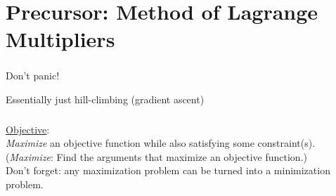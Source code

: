\section{Precursor: Method of Lagrange Multipliers}


\begin{frame}\frametitle{\secname} 
    \begin{center}
    \slidesonly{\huge}
	Don't panic!
    \end{center}
    \begin{center}
        Essentially just hill-climbing (gradient ascent)
    \end{center}
\end{frame}

\begin{frame}\frametitle{\secname}

\underline{Objective}: \\
\textit{Maximize} an objective function while also satisfying some constraint(s).\\
{
\small(\textit{Maximize}: Find the arguments that maximize an objective function.)
}\\[5mm]
Don't forget: any maximization problem can be turned into a minimization problem.
\end{frame}

